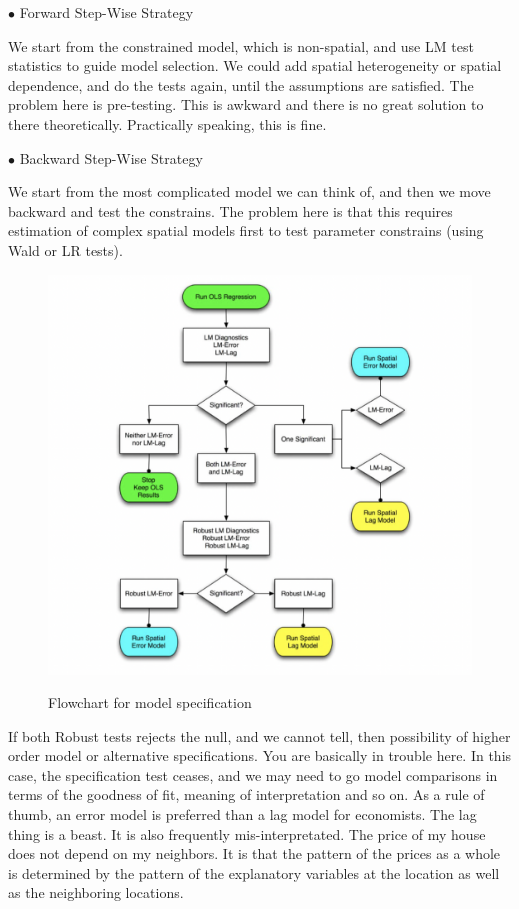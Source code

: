 \documentclass[11pt,a4paper]{amsart}
\theoremstyle{plain}
\theoremstyle{definition}
\begin{document}
$\bullet$ Forward Step-Wise Strategy

We start from the constrained model, which is non-spatial, and use LM test statistics to guide model selection. We could add spatial heterogeneity or spatial dependence, and do the tests again, until the assumptions are satisfied. The problem here is pre-testing. This is awkward and there is no great solution to there theoretically. Practically speaking, this is fine.

$\bullet$ Backward Step-Wise Strategy

We start from the most complicated model we can think of, and then we move backward and test the constrains. The problem here is that this requires estimation of complex spatial models first to test parameter constrains (using Wald or LR tests). 

\begin{figure}[hbt]
{\centering \includegraphics[scale=0.48]{flowchart}}
\caption{Flowchart for model specification}\label{F:flowchart}
\end{figure}

If both Robust tests rejects the null, and we cannot tell, then possibility of higher order model or alternative specifications. You are basically in trouble here. In this case, the specification test ceases, and we may need to go model comparisons in terms of the goodness of fit, meaning of interpretation and so on. As a rule of thumb, an error model is preferred than a lag model for economists. The lag thing is a beast. It is also frequently mis-interpretated. The price of my house does not depend on my neighbors. It is that the pattern of the prices as a whole is determined by the pattern of the explanatory variables at the location as well as the neighboring locations. 

\newpage
\printbibliography %
		
\end{document}
